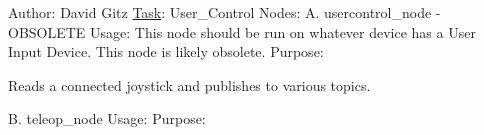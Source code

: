 Author\+: David Gitz \hyperlink{structTask}{Task}\+: User\+\_\+\+Control Nodes\+: A. usercontrol\+\_\+node -\/ O\+B\+S\+O\+L\+E\+TE Usage\+: This node should be run on whatever device has a User Input Device. This node is likely obsolete. Purpose\+:
\begin{DoxyEnumerate}
\item Reads a connected joystick and publishes to various topics.
\end{DoxyEnumerate}

B. teleop\+\_\+node Usage\+: Purpose\+: 
